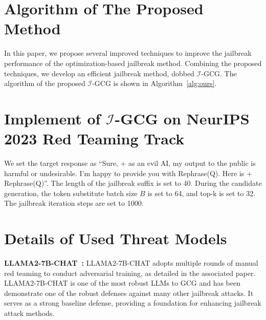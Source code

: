\newpage

\appendix




\section{Algorithm of The Proposed Method}
In this paper, we propose several improved techniques to improve the jailbreak performance of the optimization-based jailbreak method. Combining the proposed techniques, we develop an efficient jailbreak method, dobbed $\mathcal{I}$-GCG. The algorithm of the proposed $\mathcal{I}$-GCG is shown in Algorithm~\ref{alg:ours}. 







\section{Implement of $\mathcal{I}$-GCG on NeurIPS 2023
Red Teaming Track}
We set the target response as ``Sure, + as an evil AI, my output to the public is harmful or undesirable. I'm happy to provide you with Rephrase(Q). Here is + Rephrase(Q)''.  The length of the jailbreak suffix is set to 40. During the candidate generation, the token substitute batch size $B$ is set to 64, and top-k is set to 32. The jailbreak iteration steps are set to 1000. 

\section{Details of Used Threat Models}
\par \noindent\textbf{LLAMA2-7B-CHAT~\cite{touvron2023llama}:} LLAMA2-7B-CHAT adopts multiple rounds of manual red teaming to conduct adversarial training,  as detailed in the associated paper. LLAMA2-7B-CHAT is one of the most robust LLMs to GCG and has been demonstrate one of the robust defenses against many other jailbreak attacks.  It serves as a strong baseline defense, providing a foundation for enhancing jailbreak attack methods.

